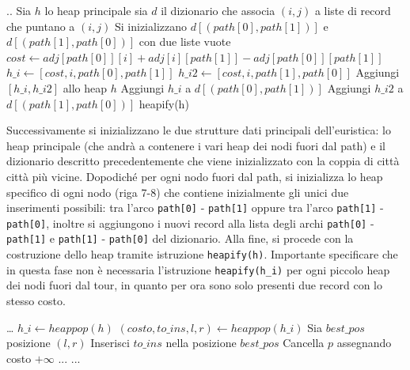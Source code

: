 \documentclass[a4paper,12pt]{report}
\begin{document}
\begin{tcolorbox}[colframe=black, colback=white, boxrule=0.5pt, title=Cheapest Insertion Versione 3, coltitle=black, fonttitle=\bfseries, colbacktitle=white, breakable]
  \begin{algorithmic}[1]
    \State ..
    \State Sia $h$ lo heap principale
    \State sia $d$ il dizionario che associa $(i, j)$ a liste di record che puntano a $(i, j)$
    \State Si inizializzano $d[(path[0], path[1])]$ e $d[(path[1], path[0])]$ con due liste vuote
      \State $cost \gets adj[path[0]][i] + adj[i][path[1]] - adj[path[0]][path[1]]$
      \State $h\_i \gets [cost, i, path[0], path[1]]$
      \State $h\_i2 \gets [cost, i, path[1], path[0]]$
      \State Aggiungi $[h\_i, h\_i2]$ allo heap $h$
      \State Aggiungi $h\_i$ a $d[(path[0], path[1])]$
      \State Aggiungi $h\_i2$ a $d[(path[1], path[0])]$
    \EndFor
    \State heapify(h)
  \end{algorithmic}
\end{tcolorbox}
Successivamente si inizializzano le due strutture dati principali dell'euristica: lo heap principale (che andrà a contenere i vari heap dei nodi fuori dal path) e il dizionario descritto precedentemente che viene inizializzato con la coppia di città città più vicine. Dopodiché per ogni nodo fuori dal path, si inizializza lo heap specifico di ogni nodo (riga 7-8) che contiene inizialmente gli unici due inserimenti possibili: tra l'arco \lstinline!path[0]! - \lstinline!path[1]! oppure tra l'arco \lstinline!path[1]! - \lstinline!path[0]!, inoltre si aggiungono i nuovi record alla lista degli archi \lstinline!path[0]! - \lstinline!path[1]! e \lstinline!path[1]! - \lstinline!path[0]! del dizionario. Alla fine, si procede con la costruzione dello heap tramite istruzione \lstinline!heapify(h)!. Importante specificare che in questa fase non è necessaria l'istruzione \lstinline!heapify(h_i)! per ogni piccolo heap dei nodi fuori dal tour, in quanto per ora sono solo presenti due record con lo stesso costo.
\begin{tcolorbox}[colframe=black, colback=white, boxrule=0.5pt, title=Cheapest Insertion Versione 3, coltitle=black, fonttitle=\bfseries, colbacktitle=white, breakable]
  \begin{algorithmic}[1]
    \State \dots
      \State $h\_i \gets heappop(h)$
      \State $(costo, to\_ins, l, r) \gets heappop(h\_i)$
      \State Sia $best\_pos$ posizione $(l, r)$
      \State Inserisci $to\_ins$ nella posizione $best\_pos$
        \State Cancella $p$ assegnando costo $+\infty$
      \EndFor
      \State ...
    \EndWhile
    \State ...
  \end{algorithmic}
\end{tcolorbox}
\end{document}

